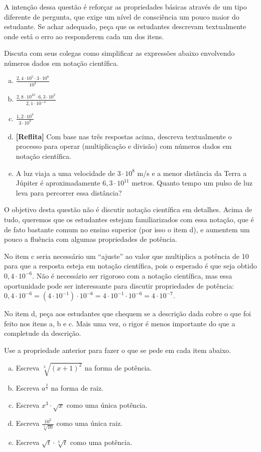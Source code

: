 \documentclass[main_estudante.tex]{subfiles}
\begin{document}
A intenção dessa questão é reforçar as propriedades básicas através de um tipo diferente de pergunta, que exige um nível de consciência um pouco maior do estudante. Se achar adequado, peça que os estudantes descrevam textualmente onde está o erro ao responderem cada um dos itens.

\begin{questao}
Discuta com seus colegas como simplificar as expressões abaixo envolvendo números dados em notação científica.
\begin{enumerate}[a)]
\item $\frac{2,4  \cdot 10^5 \cdot 3  \cdot 10^8}{10^3}$
\item $\frac{2,8  \cdot 10^{10} \cdot 6,3  \cdot 10^2}{2,1 \cdot 10^{-4}}$
\item $\frac{1,2  \cdot 10^3}{3 \cdot 10^9}$
\item \textbf{[Reflita]} Com base nas três respostas acima, descreva textualmente o processo para operar (multiplicação e divisão) com números dados em notação científica.
\item A luz viaja a uma velocidade de $3 \cdot 10^8$ m/s e a menor distância da Terra a Júpiter é aproximadamente $6,3 \cdot 10^{11}$ metros. Quanto tempo um pulso de luz leva para percorrer essa distância?
\end{enumerate}
\end{questao}

O objetivo desta questão não é discutir notação científica em detalhes. Acima de tudo, queremos que os estudantes estejam familiarizados com essa notação, que é de fato bastante comum no ensino superior (por isso o item d), e aumentem um pouco a fluência com algumas propriedades de potência.

No item c seria necessário um ``ajuste'' ao valor que multiplica a potência de 10 para que a resposta esteja em notação científica, pois o esperado é que seja obtido $0,4 \cdot 10^{-6}$. Não é necessário ser rigoroso com a notação científica, mas essa oportunidade pode ser interessante para discutir propriedades de potência: $0,4 \cdot 10^{-6} = (4 \cdot 10^{-1}) \cdot 10^{-6} = 4 \cdot 10^{-1} \cdot 10^{-6} = 4 \cdot 10^{-7}$.

No item d, peça aos estudantes que chequem se a descrição dada cobre o que foi feito nos itens a, b e c. Mais uma vez, o rigor é menos importante do que a completude da descrição.

\begin{questao}
Use a propriedade anterior para fazer o que se pede em cada item abaixo.
\begin{enumerate}[a)]
\item Escreva $\sqrt[3]{(x+1)^2}$ na forma de potência.
\item Escreva $a^{\frac{3}{5}}$ na forma de raiz.
\item Escreva $x^3 \cdot \sqrt{x}$ como uma única potência.
\item Escreva $\frac{10^2}{\sqrt[3]{10}}$ como uma única raiz.
\item Escreva $\sqrt{t} \cdot \sqrt[3]{t}$ como uma potência.
\end{enumerate}
\end{questao}
\end{document}

